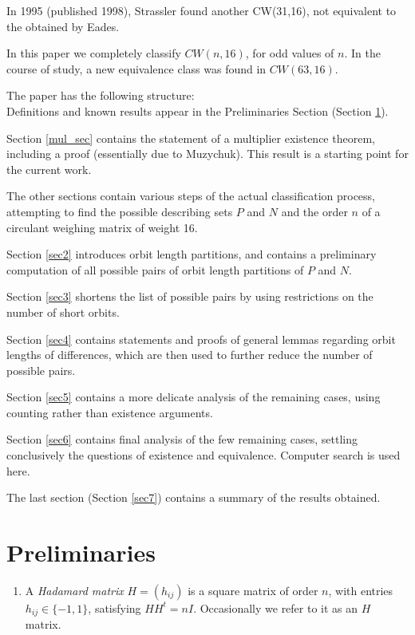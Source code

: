{In 1995 (published 1998), Strassler \cite{str95} found another CW(31,16), not equivalent to the obtained by Eades.

In this paper we completely classify $CW(n,16)$, for odd values of $n$. In the 
course of study, a new equivalence class was found in $CW(63,16)$. 



The paper has the following structure: \\
Definitions and known results appear in the Preliminaries Section (Section \ref{sec1}). 

Section \ref{mul_sec} contains the statement of a multiplier existence 
theorem, including a proof (essentially due to Muzychuk). This result is a 
starting point for the current work. 

The other sections contain various steps of the actual classification process,  
 attempting to find the possible describing sets 
 $P$ and $N$ and the order $n$ of a circulant weighing matrix of weight 16.

      Section \ref{sec2}  introduces orbit length partitions, and 
	   contains a preliminary computation of 
	   all possible pairs of orbit length partitions of $P$ and $N$. 
      
      Section \ref{sec3} shortens the list of possible pairs by using 
	   restrictions  on the number of short orbits. 

      Section \ref{sec4} contains statements and proofs of general lemmas regarding 
      orbit lengths of differences, which  are then used to further reduce the number of possible pairs. 
	       
      Section \ref{sec5} contains a more delicate analysis of the remaining cases, using 
	counting rather than existence arguments.   
      
      Section \ref{sec6} contains final analysis of the few remaining cases, settling conclusively the 
	questions of existence and equivalence.  Computer search is used here. 
      
      The last section (Section \ref{sec7}) contains a summary of the results 
      obtained.



\section{ Preliminaries } \label{sec1}
\begin{enumerate}
     \item A {\it Hadamard matrix} $ H=(h_{ij}) $ is a square matrix of order $ n $, with entries $ h_{ij} \in \{-1,1\}$, satisfying $ HH^t=nI $. Occasionally we refer to it as an $ H $ matrix.
     

\end{enumerate}}
